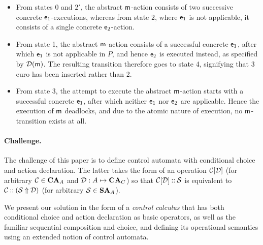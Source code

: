 \begin{itemize}
\item From states 0 and $2'$, the abstract $\mathsf{m}$-action consists of two successive concrete $\mathsf{e}_1$-executions, whereas from state $2$, where $\mathsf{e}_1$ is not applicable, it consists of a single concrete $\mathsf{e}_2$-action.

\item From state 1, the abstract $\mathsf{m}$-action consists of a successful concrete $\mathsf{e}_1$, after which $\mathsf{e}_1$ is not applicable in $P$, and hence $\mathsf{e}_2$ is executed instead, as specified by $\mathcal{D}(\mathsf{m})$. The resulting transition therefore goes to state 4, signifying that 3 euro has been inserted rather than 2.

\item From state 3, the attempt to execute the abstract $\mathsf{m}$-action starts with a successful concrete $\mathsf{e}_1$, after which neither $\mathsf{e}_1$ nor $\mathsf{e}_2$ are applicable. Hence the execution of $\mathsf{m}$ deadlocks, and due to the atomic nature of execution, no $\mathsf{m}$-transition exists at all.
\end{itemize}

\paragraph{Challenge.}

The challenge of this paper is to define control automata with conditional choice and action declaration. The latter takes the form of an operation $\mathcal{C}[\mathcal{D}]$ (for arbitrary $\mathcal{C}\in \mathbf{CA}_A$ and $\mathcal{D}:A\mapsto \mathbf{CA}_C$) so that $\mathcal{C}[\mathcal{D}]\mathbin{{:}{:}} \mathcal{S}$ is equivalent to $\mathcal{C}\mathbin{{:}{:}} (\mathcal{S}\mathbin{\Uparrow} \mathcal{D})$ (for arbitrary $\mathcal{S}\in \mathbf{SA}_A$).

We present our solution in the form of a \emph{control calculus} that has both conditional choice and action declaration as basic operators, as well as the familiar sequential composition and choice, and defining its operational semantics using an extended notion of control automata.

